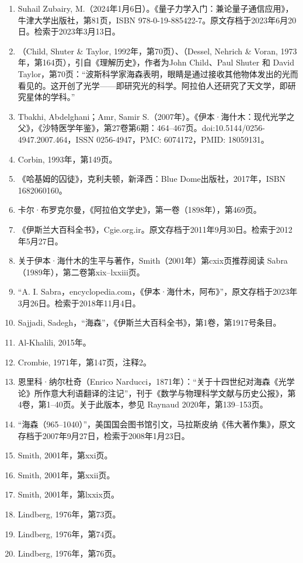 \begin{enumerate}
\item Suhail Zubairy, M.（2024年1月6日）。《量子力学入门：兼论量子通信应用》，牛津大学出版社，第81页，ISBN 978-0-19-885422-7。原文存档于2023年6月20日。检索于2023年3月13日。
\item （Child, Shuter & Taylor, 1992年，第70页）、（Dessel, Nehrich & Voran, 1973年，第164页），引自《理解历史》，作者为John Child、Paul Shuter 和 David Taylor，第70页：“波斯科学家海森表明，眼睛是通过接收其他物体发出的光而看见的。这开创了光学——即研究光的科学。阿拉伯人还研究了天文学，即研究星体的学科。”
\item Tbakhi, Abdelghani；Amr, Samir S.（2007年）。《伊本·海什木：现代光学之父》，《沙特医学年鉴》，第27卷第6期：464–467页。doi:10.5144/0256-4947.2007.464，ISSN 0256-4947，PMC: 6074172，PMID: 18059131。
\item Corbin, 1993年，第149页。
\item 《哈基姆的囚徒》，克利夫顿，新泽西：Blue Dome出版社，2017年，ISBN 1682060160。
\item 卡尔·布罗克尔曼，《阿拉伯文学史》，第一卷（1898年），第469页。
\item 《伊斯兰大百科全书》，Cgie.org.ir。原文存档于2011年9月30日。检索于2012年5月27日。
\item 关于伊本·海什木的生平与著作，Smith（2001年）第cxix页推荐阅读 Sabra（1989年），第二卷第xix–lxxiii页。
\item “A. I. Sabra，encyclopedia.com，《伊本·海什木，阿布》”，原文存档于2023年3月26日。检索于2018年11月4日。
\item Sajjadi, Sadegh，“海森”，《伊斯兰大百科全书》，第1卷，第1917号条目。
\item Al-Khalili, 2015年。
\item Crombie, 1971年，第147页，注释2。
\item 恩里科·纳尔杜奇（Enrico Narducci，1871年）：“关于十四世纪对海森《光学论》所作意大利语翻译的注记”，刊于《数学与物理科学文献与历史公报》，第4卷，第1–40页。关于此版本，参见 Raynaud 2020年，第139–153页。
\item “海森（965–1040）”，美国国会图书馆引文，马拉斯皮纳《伟大著作集》，原文存档于2007年9月27日，检索于2008年1月23日。
\item Smith, 2001年，第xxi页。
\item Smith, 2001年，第xxii页。
\item Smith, 2001年，第lxxix页。
\item Lindberg, 1976年，第73页。
\item Lindberg, 1976年，第74页。
\item Lindberg, 1976年，第76页。

\end{enumerate}
